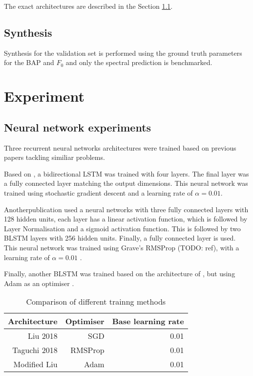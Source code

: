 \documentclass[a4paper]{article}
\begin{document}
The exact architectures are described in the Section \ref{nnexperiment}.

\subsection{Synthesis}

Synthesis for the validation set is performed using the ground truth
parameters for the BAP and $ F_0 $ and only the spectral prediction is
benchmarked.

\section{Experiment}

\subsection{Neural network experiments} \label{nnexperiment}

Three recurrent neural networks architectures were trained based on previous
papers tackling similiar problems.

Based on \cite{Liu2018}, a bidirectional LSTM was trained with four layers.
The final layer was a fully connected layer matching the output dimensions.
This neural network was trained using stochastic gradient descent and
a learning rate of \( \alpha = 0.01 \).

Anotherpublication \cite{Taguchi} used a neural networks with three fully
connected layers with 128 hidden units, each layer has a linear activation
function, which is followed by Layer Normalisation and a sigmoid activation
function. This is followed by two BLSTM layers with 256 hidden units. Finally,
a fully connected layer is used. This neural network was trained using Grave's RMSProp (TODO: ref),
with a learning rate of \( \alpha = 0.01 \) .

Finally, another BLSTM was trained based on the architecture of
\cite{Liu2018}, but using Adam as an optimiser \cite{Kingma2015}.

\begin{table}[th]
  \caption{Comparison of different trainng methods}
  \label{tab:example}
  \centering
  \begin{tabular}{ r r r }
    \toprule
    \textbf{Architecture} & \textbf{Optimiser} & \textbf{Base learning rate} \\
    \midrule
    Liu 2018 & SGD & 0.01 \\
    Taguchi 2018 & RMSProp & 0.01       \\
    Modified Liu & Adam & 0.01               \\
    \bottomrule
  \end{tabular}
  
\end{table}
\end{document}
